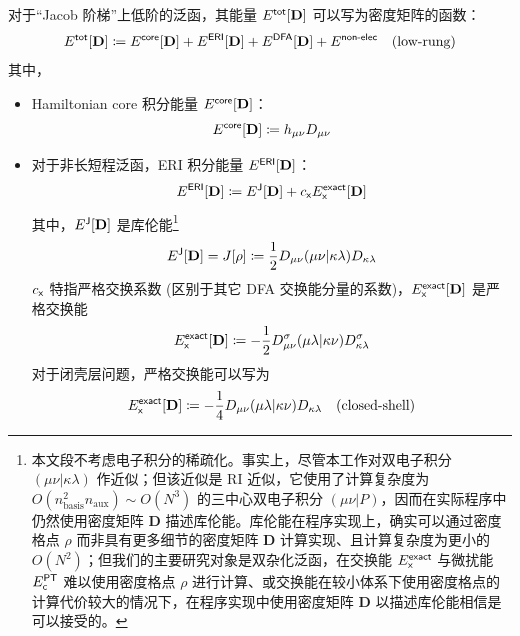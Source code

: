 对于“Jacob 阶梯”上低阶的泛函，其能量 $E^{\textsf{tot}}[\mathbf{D}]$ 可以写为密度矩阵的函数：
\begin{equation}
    E^{\textsf{tot}}[\mathbf{D}] \coloneq E^{\textsf{core}} [\mathbf{D}] + E^{\textsf{ERI}} [\mathbf{D}] + E^{\textsf{DFA}} [\mathbf{D}] + E^{\textsf{non-elec}} \quad \text{(low-rung)}
\end{equation}
其中，
\begin{itemize}[nosep]
\item Hamiltonian core 积分能量 $E^{\textsf{core}} [\mathbf{D}]$：
\begin{equation}
    E^{\textsf{core}} [\mathbf{D}] \coloneq h_{\mu \nu} D_{\mu \nu}
\end{equation}
\item 对于非长短程泛函，ERI 积分能量 $E^{\textsf{ERI}} [\mathbf{D}]$：
\begin{equation}
    \label{eq.3.def.eri}
    E^{\textsf{ERI}} [\mathbf{D}] \coloneq E^{\textsf{J}} [\mathbf{D}] + c_{\textsf{x}} E_{\textsf{x}}^{\textsf{exact}} [\mathbf{D}]
\end{equation}
其中，$E^{\textsf{J}} [\mathbf{D}]$ 是库伦能\footnote{本文段不考虑电子积分的稀疏化。事实上，尽管本工作对双电子积分 $(\mu \nu | \kappa \lambda)$ 作近似；但该近似是 RI 近似，它使用了计算复杂度为 $O(n_\mathrm{basis}^2 n_\mathrm{aux}) \sim O(N^3)$ 的三中心双电子积分 $(\mu \nu | P)$，因而在实际程序中仍然使用密度矩阵 $\mathbf{D}$ 描述库伦能。库伦能在程序实现上，确实可以通过密度格点 $\rho$ 而非具有更多细节的密度矩阵 $\mathbf{D}$ 计算实现、且计算复杂度为更小的 $O(N^2)$\cite{Toivanen-Sundholm.PCCP.2015}；但我们的主要研究对象是双杂化泛函，在交换能 $E_{\textsf{x}}^{\textsf{exact}}$ 与微扰能 $E_{\textsf{c}}^{\textsf{PT}}$ 难以使用密度格点 $\rho$ 进行计算、或交换能在较小体系下使用密度格点的计算代价较大\cite{IZSAK-NEESE.JCP.2011}的情况下，在程序实现中使用密度矩阵 $\mathbf{D}$ 以描述库伦能相信是可以接受的。}
\begin{equation}
    E^{\textsf{J}} [\mathbf{D}] = J[\rho] \coloneq \frac{1}{2} D_{\mu \nu} (\mu \nu | \kappa \lambda) D_{\kappa \lambda}
\end{equation}
$c_{\textsf{x}}$ 特指严格交换系数 (区别于其它 DFA 交换能分量的系数)，$E_{\textsf{x}}^{\textsf{exact}} [\mathbf{D}]$ 是严格交换能
\begin{equation}
    E_{\textsf{x}}^{\textsf{exact}} [\mathbf{D}] \coloneq - \frac{1}{2} D_{\mu \nu}^\sigma (\mu \lambda | \kappa \nu) D_{\kappa \lambda}^\sigma
\end{equation}
对于闭壳层问题，严格交换能可以写为
\begin{equation}
    E_\textmt{x}^\textmt{exact} [\mathbf{D}] \coloneq - \frac{1}{4} D_{\mu \nu} (\mu \lambda | \kappa \nu) D_{\kappa \lambda} \quad \text{(closed-shell)}

\end{equation}
\end{itemize}
